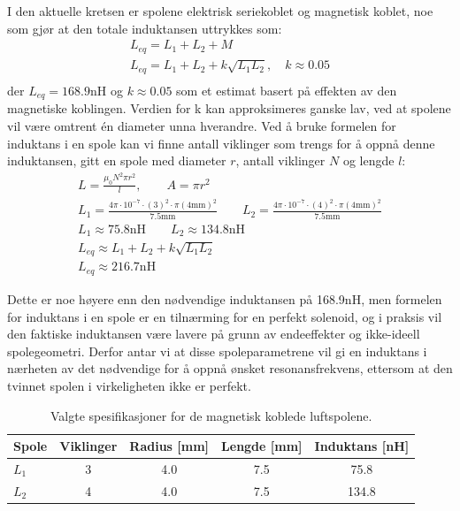 \noindent
I den aktuelle kretsen er spolene elektrisk seriekoblet og magnetisk koblet, noe som gjør at den totale induktansen uttrykkes som:
\begin{gather*}
    L_{eq} = L_1 + L_2 + M \\
    L_{eq} = L_1 + L_2 + k \sqrt{L_1L_2}, \quad k \approx 0.05 \\
\end{gather*}
\noindent
der $L_{eq} = 168.9\text{nH}$ og $k \approx 0.05$ som et estimat basert på effekten av den magnetiske koblingen. Verdien for k kan approksimeres ganske lav, ved at spolene vil være omtrent én diameter unna hverandre. Ved å bruke formelen for induktans i en spole kan vi finne antall viklinger som trengs for å oppnå denne induktansen, gitt en spole med diameter $r$, antall viklinger $N$ og lengde $l$:
\begin{gather*}
    L = \frac{\mu_0 N^2 \pi r^2}{l}, \qquad A = \pi r^2 \\
    L_1 = \frac{4\pi \cdot 10^{-7} \cdot (3)^2 \cdot \pi (4\text{mm})^2}{7.5\text{mm}} \qquad L_2 = \frac{4\pi \cdot 10^{-7} \cdot (4)^2 \cdot \pi (4\text{mm})^2}{7.5\text{mm}} \\
    L_1 \approx 75.8\text{nH} \qquad
    L_2 \approx 134.8\text{nH} \\
    L_{eq} \approx L_1 + L_2 + k \sqrt{L_1 L_2} \\
    L_{eq} \approx 216.7\text{nH}
\end{gather*}

\noindent
Dette er noe høyere enn den nødvendige induktansen på 168.9nH, men formelen for induktans i en spole er en tilnærming for en perfekt solenoid, og i praksis vil den faktiske induktansen være lavere på grunn av endeeffekter og ikke-ideell spolegeometri. Derfor antar vi at disse spoleparametrene vil gi en induktans i nærheten av det nødvendige for å oppnå ønsket resonansfrekvens, ettersom at den tvinnet spolen i virkeligheten ikke er perfekt.

\begin{table}[H]
\centering
\caption{Valgte spesifikasjoner for de magnetisk koblede luftspolene.}
\label{tab:spolespesifikasjoner}
\begin{tabular}{lcccc}
\toprule
\textbf{Spole} & \textbf{Viklinger} & \textbf{Radius [mm]} & \textbf{Lengde [mm]}  & \textbf{Induktans [nH]} \\
\midrule

$L_1$ & 3 & 4.0 & 7.5 & 75.8 \\
$L_2$ & 4 & 4.0 & 7.5 & 134.8 \\

\bottomrule
\end{tabular}
\end{table}

